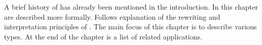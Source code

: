 
\chapter{\lsystems}

A brief history of \lsystems has already been mentioned in the introduction.
In this chapter are \lsystems described more formally.
Follows explanation of the rewriting and interpretation principles of \lsystems.
The main focus of this chapter is to describe various \lsystem types.
At the end of the chapter is a list of related applications.




\clearpage


\clearpage


































